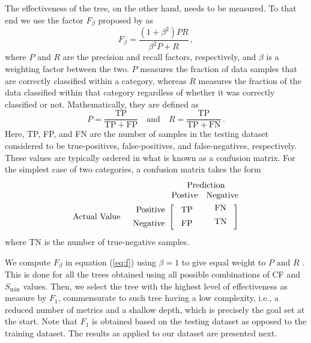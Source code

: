 The effectiveness of the tree, on the other hand, needs to be measured. To that end we use the factor $F_{\beta}$ proposed by \citet{Rijsbergen_1979_Book} as
% 
\begin{equation}
	\label{eq:f}
	F_{\beta} = \frac{ (1 + \beta^2) P R}{\beta^2 P + R}
	\, ,
\end{equation}
% 
where $P$ and $R$ are the precision and recall factors, respectively, and $\beta$ is a weighting factor between the two. $P$ measures the fraction of data samples that are correctly classified within a category, whereas $R$ measures the fraction of the data classified within that category regardless of whether it was correctly classified or not. Mathematically, they are defined as
% 
\begin{equation}
	P = \frac{ \mathrm{TP} }{ \mathrm{TP} + \mathrm{FP} } 
	\quad \mathrm{and} \quad
	R = \frac{ \mathrm{TP} }{ \mathrm{TP} + \mathrm{FN} }
	\, .
\end{equation}
% 
Here, TP, FP, and FN are the number of samples in the testing dataset considered to be true-positives, false-positives, and false-negatives, respectively. These values are typically ordered in what is known as a confusion matrix. For the simplest case of two categories, a confusion matrix takes the form
% 
\begin{equation}
\nonumber
\begin{array}{rr@{}rl}
	&					&	\multicolumn{2}{c}{\mathrm{Prediction}}		\\
	&					&	\mathrm{Postive}	&	\mathrm{Negative}	\\[0.75ex]
	\mathrm{Actual~Value}		
	&	\begin{array}{r}
			\mathrm{Positive} \\[1ex]
			\mathrm{Negative} 
		\end{array}
	&	\left[~
		\begin{array}{c}
			\mathrm{TP} \\[1ex]
			\mathrm{FP} 
		\end{array}\right.
	&
		\left.
		\begin{array}{cc}
			~\mathrm{FN} \\[1ex]
			~\mathrm{TN} \\[1ex]
		\end{array}~\right]
\end{array}
\end{equation}
% 
where TN is the number of true-negative samples.

We compute $F_{\beta}$ in equation (\ref{eq:f}) using $\beta = 1$ to give equal weight to $P$ and $R$ \citep{McCarthy_1995_Proc}. This is done for all the trees obtained using all possible combinations of CF and $S_{\min}$ values. Then, we select the tree with the highest level of effectiveness as measure by $F_1$, commensurate to such tree having a low complexity, i.e., a reduced number of metrics and a shallow depth, which is precisely the goal set at the start. Note that $F_1$ is obtained based on the testing dataset as opposed to the training dataset. The results as applied to our dataset are presented next.


